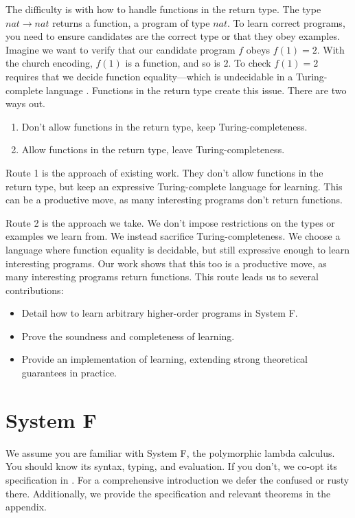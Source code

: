 \documentclass[acmsmall]{acmart}
\theoremstyle{mytheoremstyle}
\begin{document}
The difficulty is with how to handle functions in the return type. The type $nat \!\to\! nat$ returns a function, a program of type $nat$. To learn correct programs, you need to ensure candidates are the correct type or that they obey examples. Imagine we want to verify that our candidate program $f$ obeys $f(1)=2$. With the church encoding, $f(1)$ is a function, and so is $2$. To check $f(1)=2$ requires that we decide function equality---which is undecidable in a Turing-complete language \cite{sipser2006introduction}. Functions in the return type create this issue. There are two ways out.

\begin{enumerate}
\item Don't allow functions in the return type, keep Turing-completeness.
\item Allow functions in the return type, leave Turing-completeness.
\end{enumerate}

Route 1 is the approach of existing work. They don't allow functions in the return type, but keep an expressive Turing-complete language for learning. This can be a productive move, as many interesting programs don't return functions.

Route 2 is the approach we take. We don't impose restrictions on the types or examples we learn from. We instead sacrifice Turing-completeness. We choose a language where function equality is decidable, but still expressive enough to learn interesting programs. Our work shows that this too is a productive move, as many interesting programs return functions. This route leads us to several contributions:
\begin{itemize}
\item Detail how to learn arbitrary higher-order programs in System F.
\item Prove the soundness and completeness of learning.
\item Provide an implementation of learning, extending strong theoretical guarantees in practice.
\end{itemize}


\section{System F}
We assume you are familiar with System F, the polymorphic lambda calculus. You should know its syntax, typing, and evaluation. If you don't, we co-opt its specification in \cite{pierce2002types}. For a comprehensive introduction we defer the confused or rusty there. Additionally, we provide the specification and relevant theorems in the appendix.
\end{document}
